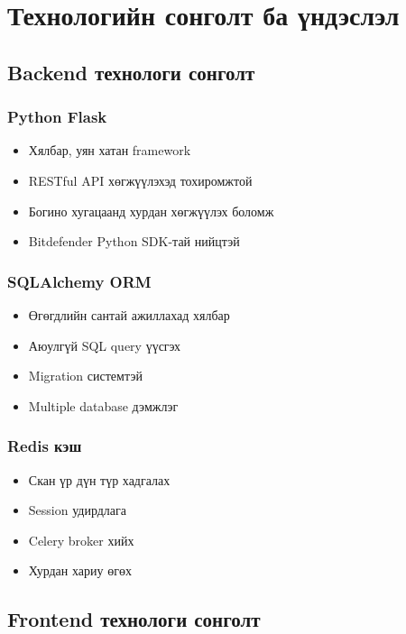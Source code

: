 \documentclass[main.tex]{subfiles}
\begin{document}
\section{Технологийн сонголт ба үндэслэл}

\subsection{Backend технологи сонголт}

\subsubsection{Python Flask}
\begin{itemize}
    \item Хялбар, уян хатан framework
    \item RESTful API хөгжүүлэхэд тохиромжтой
    \item Богино хугацаанд хурдан хөгжүүлэх боломж
    \item Bitdefender Python SDK-тай нийцтэй
\end{itemize}

\subsubsection{SQLAlchemy ORM}
\begin{itemize}
    \item Өгөгдлийн сантай ажиллахад хялбар
    \item Аюулгүй SQL query үүсгэх
    \item Migration системтэй
    \item Multiple database дэмжлэг
\end{itemize}

\subsubsection{Redis кэш}
\begin{itemize}
    \item Скан үр дүн түр хадгалах
    \item Session удирдлага
    \item Celery broker хийх
    \item Хурдан хариу өгөх
\end{itemize}

\subsection{Frontend технологи сонголт}
\end{document}
